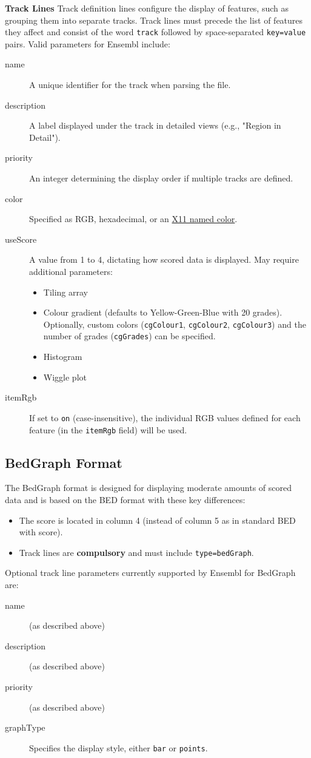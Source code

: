 \documentclass[../main.tex]{subfiles}
\begin{document}
\textbf{Track Lines}
Track definition lines configure the display of features, such as grouping them into separate tracks. Track lines must precede the list of features they affect and consist of the word \texttt{track} followed by space-separated \texttt{key=value} pairs. Valid parameters for Ensembl include:

\begin{description}
    \item[name] A unique identifier for the track when parsing the file.
    \item[description] A label displayed under the track in detailed views (e.g., "Region in Detail").
    \item[priority] An integer determining the display order if multiple tracks are defined.
    \item[color] Specified as RGB, hexadecimal, or an \href{https://www.X.org/releases/X11R7.6/doc/xorg-docs/specs/RGBColorNames.txt}{X11 named color}.
    \item[useScore] A value from 1 to 4, dictating how scored data is displayed. May require additional parameters:
    \begin{itemize}
        \item Tiling array
        \item Colour gradient (defaults to Yellow-Green-Blue with 20 grades). Optionally, custom colors (\texttt{cgColour1}, \texttt{cgColour2}, \texttt{cgColour3}) and the number of grades (\texttt{cgGrades}) can be specified.
        \item Histogram
        \item Wiggle plot
    \end{itemize}
    \item[itemRgb] If set to \texttt{on} (case-insensitive), the individual RGB values defined for each feature (in the \texttt{itemRgb} field) will be used.
\end{description}

\subsection*{BedGraph Format}
The BedGraph format is designed for displaying moderate amounts of scored data and is based on the BED format with these key differences:
\begin{itemize}
    \item The score is located in column 4 (instead of column 5 as in standard BED with score).
    \item Track lines are \textbf{compulsory} and must include \texttt{type=bedGraph}.
\end{itemize}
Optional track line parameters currently supported by Ensembl for BedGraph are:
\begin{description}
    \item[name] (as described above)
    \item[description] (as described above)
    \item[priority] (as described above)
    \item[graphType] Specifies the display style, either \texttt{bar} or \texttt{points}.
\end{description}
\end{document}
